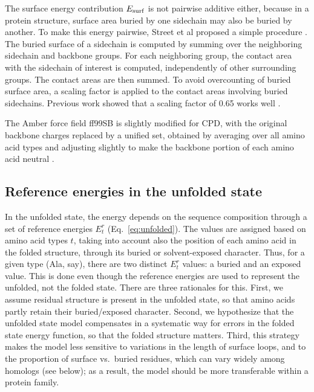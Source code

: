 \documentclass[12pt]{article}
\begin{document}
The surface energy contribution $E_{\rm surf}$ is not pairwise additive either, because in a protein structure,
surface area buried by one sidechain may also be buried by another. To make this energy pairwise, Street et al
proposed a simple procedure \cite{Street98}. The buried surface of a sidechain is computed by summing over the
neighboring sidechain and backbone groups. For each neighboring group, the contact area with the sidechain of
interest is computed, independently of other surrounding groups. The contact areas are then summed. To avoid
overcounting of buried surface area, a scaling factor is applied to the contact areas involving buried sidechains.
Previous work showed that a scaling factor of 0.65 works well \cite{Lopes07,Gaillard14}.

The Amber force field ff99SB is slightly modified for CPD, with the original backbone charges replaced by a unified
set, obtained by averaging over all amino acid types and adjusting slightly to make the backbone portion of each
amino acid neutral \cite{Aleksandrov10b}. 

\subsection{Reference energies in the unfolded state}
In the unfolded state, the energy depends on the sequence composition through a set of reference energies $E^r_t$
(Eq.\ \ref{eq:unfolded}). The values are assigned based on amino acid types $t$, taking into account also the position
of each amino acid in the folded structure, through its buried or solvent-exposed character. Thus, for a given type
(Ala, say), there are two distinct $E^r_t$ values: a buried and an exposed value. This is done even though the reference
energies are used to represent the unfolded, not the folded state. There are three rationales for this. First, we assume
residual structure is present in the unfolded state, so that amino acids partly retain their buried/exposed character.
Second, we hypothesize that the unfolded state model compensates in a systematic way for errors in the folded state energy
function, so that the folded structure matters. Third, this strategy makes the model less sensitive to variations in
the length of surface loops, and to the proportion of surface vs.\ buried residues, which can vary widely among homologs
(see below); as a result, the model should be more transferable within a protein family.
\end{document}
